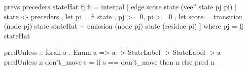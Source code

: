 prevs preceders stateHat fj fi =
 internal [ edge score state (vee'' state pj pi)
          | state <- preceders
          , let pi = fi state
          , pj >= 0, pi >= 0
          , let score = transition (node pj) state stateHat
                        + emission (node pj) state (residue pi)
          ]
 where pj = fj stateHat

predUnless :: forall a . Enum a => a -> StateLabel -> StateLabel -> a
predUnless n don't_move s = if s == don't_move then n else pred n
